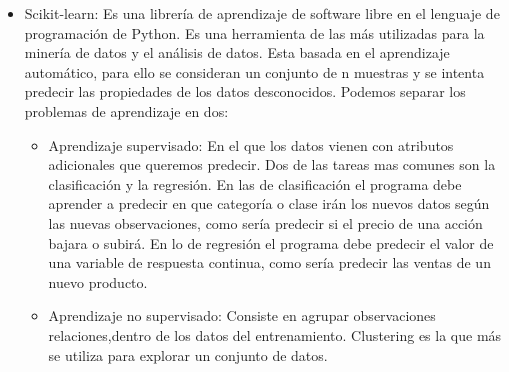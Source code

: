 \begin{itemize}
\item Scikit-learn: Es una librería de aprendizaje de software libre en el lenguaje de programación de Python. Es una herramienta de las más utilizadas para la minería de datos y el análisis de datos. 
Esta basada en el aprendizaje automático, para ello se consideran un conjunto de n muestras y se intenta predecir las propiedades de los datos desconocidos. Podemos separar los problemas de aprendizaje en dos:

	\begin{itemize}
		\item Aprendizaje supervisado: En el que los datos vienen con atributos adicionales que queremos predecir. Dos de las tareas mas comunes son la clasificación y la regresión. En las de clasificación el programa debe aprender a predecir en que categoría o clase irán los nuevos datos según las nuevas observaciones, como sería predecir si el precio de una acción bajara o subirá. En lo de regresión el programa debe predecir el valor de una variable de respuesta continua, como sería predecir las ventas de un nuevo producto. 

		\item Aprendizaje no supervisado: Consiste en agrupar observaciones relaciones,dentro de los datos del entrenamiento. Clustering es la que más se utiliza para explorar un conjunto de datos.

	\end{itemize}
\end{itemize}